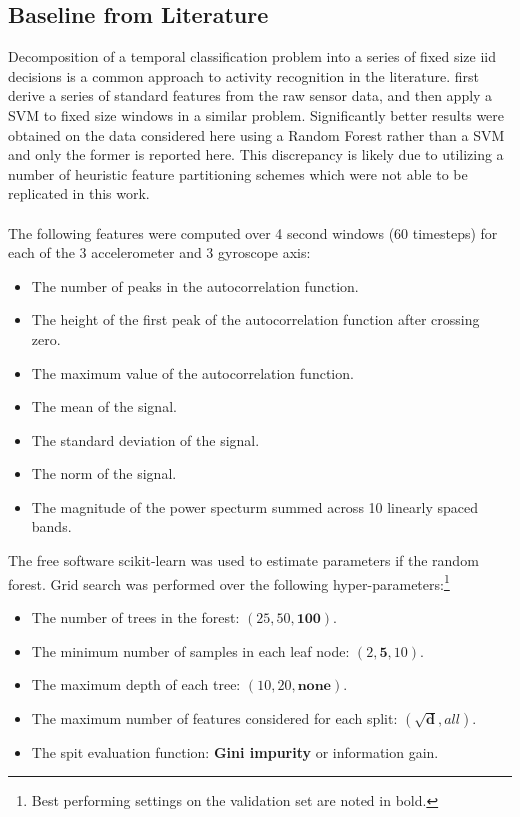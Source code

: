 \documentclass[12pt]{report}
\newcommand{\1}[0]{\mathbbm{1}}
\begin{document}
\subsection{Baseline from Literature}
Decomposition of a temporal classification problem into a series 
of fixed size iid decisions is a common approach to activity recognition
in the literature. \cite{ms-activity} first derive a series of standard features
from the raw sensor data, and then apply a \ac{SVM} to fixed size windows in a similar problem. 
Significantly better results were obtained on the data considered here using a Random Forest 
rather than a \ac{SVM} and only the former is reported here. This discrepancy is likely due 
to \cite{ms-activity} utilizing a number of heuristic feature partitioning schemes which were 
not able to be replicated in this work.
\\\\
The following features were computed over 4 second windows (60 timesteps)
for each of the 3 accelerometer and 3 gyroscope axis:
\begin{itemize}[nosep]
    \item The number of peaks in the autocorrelation function.
    \item The height of the first peak of the autocorrelation function after crossing zero.
    \item The maximum value of the autocorrelation function.
    \item The mean of the signal.
    \item The standard deviation of the signal.
    \item The norm of the signal.
    \item The magnitude of the power specturm summed across 10 linearly spaced bands.
\end{itemize}
The free software scikit-learn \cite{scikit-learn} was used
to estimate parameters if the random forest. Grid search was performed 
over the following hyper-parameters:\footnote{
Best performing settings on the validation set are noted in bold.
}
\begin{itemize}[nosep]
    \item The number of trees in the forest: $(25, 50, \mathbf{100})$.
    \item The minimum number of samples in each leaf node: $(2, \mathbf{5}, 10)$.
    \item The maximum depth of each tree: $(10, 20, \mathbf{none})$.
    \item The maximum number of features considered for each split: $(\mathbf{\sqrt{d}}, all)$.
    \item The spit evaluation function: \textbf{Gini impurity} or information gain.
\end{itemize}
\end{document}
